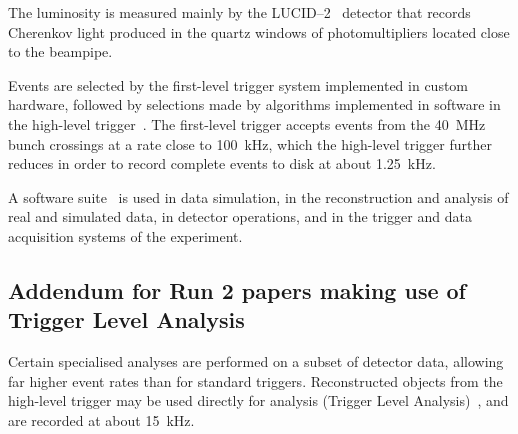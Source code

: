 The luminosity is measured mainly by the LUCID--2~\cite{LUCID2} detector that records Cherenkov light produced in the quartz windows of photomultipliers located close to the beampipe.

Events are selected by the first-level trigger system implemented in custom hardware,
followed by selections made by algorithms implemented in software in the high-level trigger~\cite{TRIG-2016-01}. 
The first-level trigger accepts events from the \qty{40}{\MHz} bunch crossings at a rate close to \qty{100}{\kHz},
which the high-level trigger further reduces in order to record complete events to disk at about \qty{1.25}{\kHz}.

A software suite~\cite{SOFT-2022-02} is used in data simulation, in the reconstruction
and analysis of real and simulated data, in detector operations, and in the trigger and data acquisition
systems of the experiment.


\subsection{Addendum for Run 2 papers making use of Trigger Level Analysis}
\label{sec:atlas2tla}

Certain specialised analyses are performed on a subset of detector data,
allowing far higher event rates than for standard triggers.
Reconstructed objects from the high-level trigger may be used directly for analysis
(Trigger Level Analysis)~\cite{EXOT-2016-20}, and are recorded at about \qty{15}{\kHz}.
